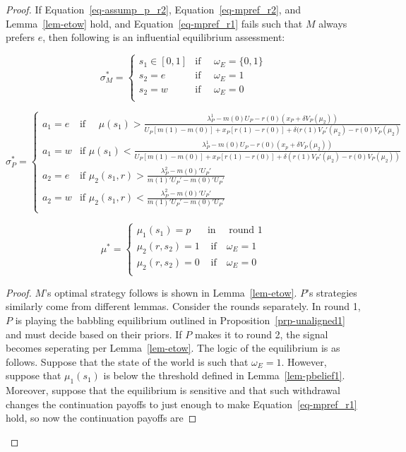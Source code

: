 \documentclass[
  12pt,
]{article}
\theoremstyle{plain}
\theoremstyle{plain}
\theoremstyle{remark}
\begin{document}
\begin{proof}
If Equation~\ref{eq-assump_p_r2}, Equation~\ref{eq-mpref_r2}, and
Lemma~\ref{lem-etow} hold, and Equation~\ref{eq-mpref_r1} fails such
that \(M\) always prefers \(e\), then following is an influential
equilibrium assessment:

\[
\sigma^{*}_M = 
\begin{cases}
s_1 \in [0, 1] & \text{if } \quad \omega_E = \{0, 1\} \\
s_2 = e  & \text{if } \quad \omega_E = 1\\
s_2 = w  & \text{if } \quad \omega_E = 0\\
\end{cases}
\]

\[
\sigma^{*}_P = 
\begin{cases}
a_1= e  & \text{if } \quad\mu(s_1)
> \frac{\lambda^1_P - m(0)U_P - r(0)(x_P + \delta V_P(\mu_2))}
 {U_P[ m(1) - m(0) ]+ x_P [r(1) -r(0)] 
 + \delta (r(1)V_P'(\mu_2) - r(0)V_P(\mu_2)}\\
a_1 = w  & \text{if } \mu(s_1)
< \frac{\lambda^1_P - m(0)U_P - r(0)(x_p + \delta V_P(\mu_2))}
 {U_P[ m(1) - m(0) ]+ x_P [r(1) -r(0)] 
 + \delta (r(1)V_P'(\mu_2) - r(0)V_P(\mu_2))}\\
a_2 = e & \text{if } \mu_2(s_1, r) > \frac{\lambda^2_P - m(0)' U_P '}{m(1)' U_P' - m(0)' U_P'}\\
a_2 = w & \text{if } \mu_2(s_1, r) < \frac{\lambda^2_P - m(0)' U_P '}{m(1)' U_P' - m(0)' U_P'}\\
\end{cases}
\]

\[
\mu^* = 
\begin{cases}
\mu_1(s_1) = p  & \text{in } \quad \text{round 1}\\
\mu_2(r, s_2) = 1 & \text{ if} \quad \omega_E = 1\\
\mu_2(r, s_2) = 0 & \text{ if} \quad \omega_E = 0\\
\end{cases}
\]

\begin{proof}
\(M\)'s optimal strategy follows is shown in Lemma~\ref{lem-etow}.
\(P\)'s strategies similarly come from different lemmas. Consider the
rounds separately. In round 1, \(P\) is playing the babbling equilibrium
outlined in Proposition~\ref{prp-unaligned1} and must decide based on
their priors. If \(P\) makes it to round 2, the signal becomes
seperating per Lemma~\ref{lem-etow}. The logic of the equilibrium is as
follows. Suppose that the state of the world is such that
\(\omega_E = 1\). However, suppose that \(\mu_1(s_1)\) is below the
threshold defined in Lemma~\ref{lem-pbelief1}. Moreover, suppose that
the equilibrium is sensitive and that such withdrawal changes the
continuation payoffs to just enough to make Equation~\ref{eq-mpref_r1}
hold, so now the continuation payoffs are


\end{proof}
\end{proof}
\end{document}
